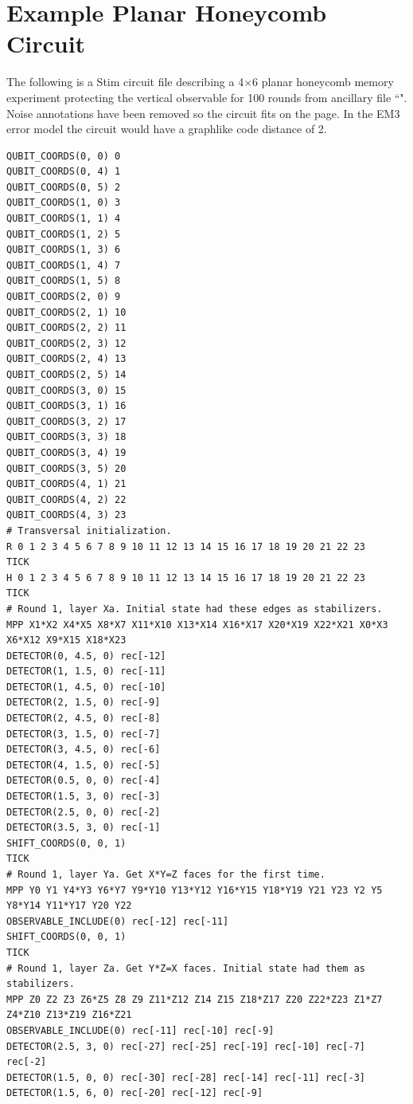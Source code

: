 \documentclass[onecolumn,a4paper,accepted=2022-09-12]{quantumarticle}
\theoremstyle{definition}
\theoremstyle{definition}
\theoremstyle{definition}
\begin{document}
\clearpage
\section{Example Planar Honeycomb Circuit}
\label{app:example_circuit}

The following is a Stim circuit file \cite{stimcircuitformat} describing a 4$\times$6 planar honeycomb memory experiment protecting the vertical observable for 100 rounds from ancillary file ``".
Noise annotations have been removed so the circuit fits on the page.
In the EM3 error model the circuit would have a graphlike code distance of 2.

\begin{lstlisting}[style=stimcircuit]
QUBIT_COORDS(0, 0) 0
QUBIT_COORDS(0, 4) 1
QUBIT_COORDS(0, 5) 2
QUBIT_COORDS(1, 0) 3
QUBIT_COORDS(1, 1) 4
QUBIT_COORDS(1, 2) 5
QUBIT_COORDS(1, 3) 6
QUBIT_COORDS(1, 4) 7
QUBIT_COORDS(1, 5) 8
QUBIT_COORDS(2, 0) 9
QUBIT_COORDS(2, 1) 10
QUBIT_COORDS(2, 2) 11
QUBIT_COORDS(2, 3) 12
QUBIT_COORDS(2, 4) 13
QUBIT_COORDS(2, 5) 14
QUBIT_COORDS(3, 0) 15
QUBIT_COORDS(3, 1) 16
QUBIT_COORDS(3, 2) 17
QUBIT_COORDS(3, 3) 18
QUBIT_COORDS(3, 4) 19
QUBIT_COORDS(3, 5) 20
QUBIT_COORDS(4, 1) 21
QUBIT_COORDS(4, 2) 22
QUBIT_COORDS(4, 3) 23
# Transversal initialization.
R 0 1 2 3 4 5 6 7 8 9 10 11 12 13 14 15 16 17 18 19 20 21 22 23
TICK
H 0 1 2 3 4 5 6 7 8 9 10 11 12 13 14 15 16 17 18 19 20 21 22 23
TICK
# Round 1, layer Xa. Initial state had these edges as stabilizers.
MPP X1*X2 X4*X5 X8*X7 X11*X10 X13*X14 X16*X17 X20*X19 X22*X21 X0*X3 X6*X12 X9*X15 X18*X23
DETECTOR(0, 4.5, 0) rec[-12]
DETECTOR(1, 1.5, 0) rec[-11]
DETECTOR(1, 4.5, 0) rec[-10]
DETECTOR(2, 1.5, 0) rec[-9]
DETECTOR(2, 4.5, 0) rec[-8]
DETECTOR(3, 1.5, 0) rec[-7]
DETECTOR(3, 4.5, 0) rec[-6]
DETECTOR(4, 1.5, 0) rec[-5]
DETECTOR(0.5, 0, 0) rec[-4]
DETECTOR(1.5, 3, 0) rec[-3]
DETECTOR(2.5, 0, 0) rec[-2]
DETECTOR(3.5, 3, 0) rec[-1]
SHIFT_COORDS(0, 0, 1)
TICK
# Round 1, layer Ya. Get X*Y=Z faces for the first time.
MPP Y0 Y1 Y4*Y3 Y6*Y7 Y9*Y10 Y13*Y12 Y16*Y15 Y18*Y19 Y21 Y23 Y2 Y5 Y8*Y14 Y11*Y17 Y20 Y22
OBSERVABLE_INCLUDE(0) rec[-12] rec[-11]
SHIFT_COORDS(0, 0, 1)
TICK
# Round 1, layer Za. Get Y*Z=X faces. Initial state had them as stabilizers.
MPP Z0 Z2 Z3 Z6*Z5 Z8 Z9 Z11*Z12 Z14 Z15 Z18*Z17 Z20 Z22*Z23 Z1*Z7 Z4*Z10 Z13*Z19 Z16*Z21
OBSERVABLE_INCLUDE(0) rec[-11] rec[-10] rec[-9]
DETECTOR(2.5, 3, 0) rec[-27] rec[-25] rec[-19] rec[-10] rec[-7] rec[-2]
DETECTOR(1.5, 0, 0) rec[-30] rec[-28] rec[-14] rec[-11] rec[-3]
DETECTOR(1.5, 6, 0) rec[-20] rec[-12] rec[-9]

\end{lstlisting}
\end{document}
